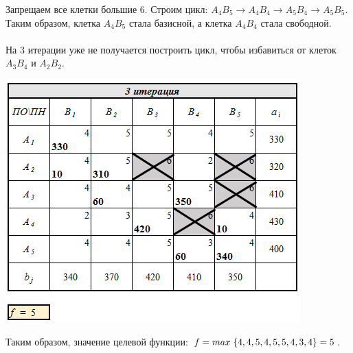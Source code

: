 \documentclass[14pt,a4paper,fleqn]{extarticle}
\begin{document}
Запрещаем все клетки большие 6. Строим цикл: $A_4B_5 \rightarrow A_4B_4 \rightarrow A_5B_4 \rightarrow A_5B_5$.\\
Таким образом, клетка $A_4B_5$ стала базисной, а клетка $A_4B_4$ стала свободной.\\\\
На 3 итерации уже не получается построить цикл, чтобы избавиться от клеток $A_3B_4$ и $A_2B_2$.
\begin{center}
	\includegraphics[scale=0.64]{7}
\end{center}
Таким образом, значение целевой функции: $f = max \hspace*{0.1cm} \{4,4,5,4,5,5,4,3,4\} = 5$.
\newpage
\end{document}

